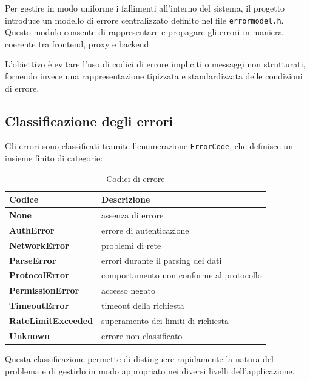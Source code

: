 \documentclass[a4paper, 11pt, twoside]{report}
\begin{document}
Per gestire in modo uniforme i fallimenti all'interno del sistema, il progetto introduce un modello di errore
centralizzato definito nel file \texttt{errormodel.h}. 
Questo modulo consente di rappresentare e propagare gli errori in maniera coerente tra frontend, proxy e backend.

L'obiettivo è evitare l'uso di codici di errore impliciti o messaggi non strutturati, fornendo invece una
rappresentazione tipizzata e standardizzata delle condizioni di errore.

\subsection{Classificazione degli errori}

Gli errori sono classificati tramite l'enumerazione \texttt{ErrorCode}, che definisce un insieme finito di categorie:

\begin{table}[h]
\centering
\begin{tabular}{@{}ll@{}}
\toprule
\textbf{Codice}            & \textbf{Descrizione}                     \\ \midrule
\textbf{None}              & assenza di errore                        \\
\textbf{AuthError}         & errore di autenticazione                 \\
\textbf{NetworkError}      & problemi di rete                         \\
\textbf{ParseError}        & errori durante il parsing dei dati       \\
\textbf{ProtocolError}     & comportamento non conforme al protocollo \\
\textbf{PermissionError}   & accesso negato                           \\
\textbf{TimeoutError}      & timeout della richiesta                  \\
\textbf{RateLimitExceeded} & superamento dei limiti di richiesta      \\
\textbf{Unknown}           & errore non classificato                  \\
\bottomrule
\end{tabular}
\caption{Codici di errore}
\end{table}

Questa classificazione permette di distinguere rapidamente la natura del problema e di gestirlo in modo appropriato nei
diversi livelli dell'applicazione.
\end{document}
